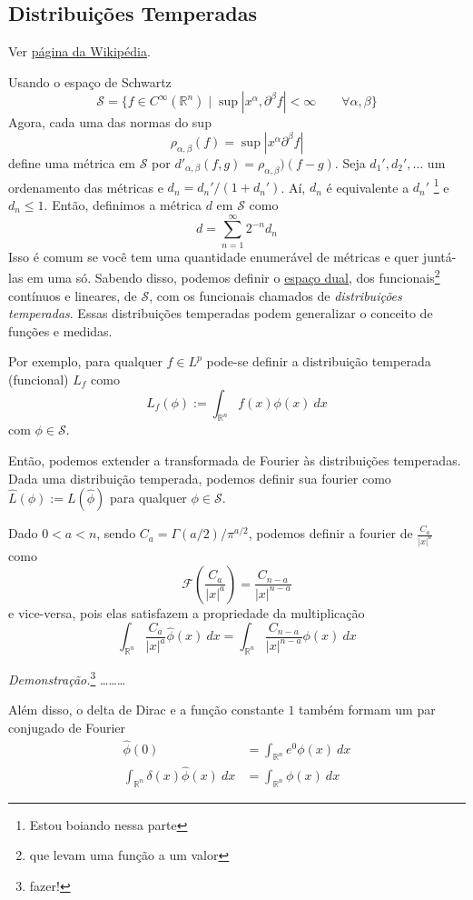 \documentclass[11pt]{article}
\newcommand{\Rn}{{\mathbb{R}^n}}
\newcommand{\p}{\partial}
\begin{document}
\subsection{Distribuições Temperadas}

Ver \href{https://en.wikipedia.org/wiki/Distribution_(mathematics)}{página da Wikipédia}.

Usando o espaço de Schwartz \[\mathcal{S} = \{ f \in C^\infty(\Rn) \mid \sup|x^\alpha, \p^\beta f| < \infty \qquad \forall \alpha,\beta\}\]
Agora, cada uma das normas do sup \[\rho_{\alpha,\beta}(f) = \sup |x^\alpha\p^\beta f| \] define uma métrica em \(\mathcal{S}\) por \(d'_{\alpha,\beta}(f,g)=\rho_{\alpha,\beta})(f-g)\). Seja \(d_1', d_2', \ldots\) um ordenamento das métricas e \(d_n = d_n' / (1 + d_n')\). Aí, \(d_n\) é equivalente a \(d_n'\) \footnote{Estou boiando nessa parte} e \(d_n \leq 1\). Então, definimos a métrica \(d\) em \(\mathcal{S}\) como \[ d = \sum_{n=1}^\infty 2^{-n}d_n \]
Isso é comum se você tem uma quantidade enumerável de métricas e quer juntá-las em uma só.
Sabendo disso, podemos definir o \href{https://en.wikipedia.org/wiki/Dual_space}{espaço dual}, dos funcionais\footnote{que levam uma função a um valor} contínuos e lineares, de \(\mathcal{S}\), com os funcionais chamados de \textit{distribuições temperadas}. Essas distribuições temperadas podem generalizar o conceito de funções e medidas.

Por exemplo, para qualquer \(f \in L^p\) pode-se definir a distribuição temperada (funcional) \(L_f\) como \[L_f(\phi) := \int_\Rn f(x)\phi(x)\ dx\] com \(\phi \in \mathcal{S}\).

Então, podemos extender a transformada de Fourier às distribuições temperadas. Dada uma distribuição temperada, podemos definir sua fourier como \(\hat{L}(\phi) := L(\hat{\phi})\) para qualquer \(\phi \in \mathcal{S}\).

Dado \(0 < a < n\), sendo \(C_a = \Gamma(a/2)/\pi^{a/2}\), podemos definir a fourier de \(\frac{C_a}{|x|^{a}}\) como \[\mathcal{F}\left(\frac{C_a}{|x|^{a}}\right) = \frac{C_{n-a}}{|x|^{n-a}}\] e vice-versa, pois elas satisfazem a propriedade da multiplicação \[\int_\Rn  \frac{C_a}{|x|^{a}} \hat{\phi}(x)\ dx = \int_\Rn \frac{C_{n-a}}{|x|^{n-a}} \phi(x)\ dx\]

\textit{Demonstração.}\footnote{fazer!} \ldots \ldots \ldots

Além disso, o delta de Dirac e a função constante \(1\) também formam um par conjugado de Fourier \begin{align*}
	\hat{\phi}(0) &= \int_\Rn e^{0} \phi(x)\ dx\\
	\int_\Rn \delta(x) \hat{\phi}(x)\ dx &= \int_\Rn \phi(x)\ dx 
\end{align*}
\end{document}
